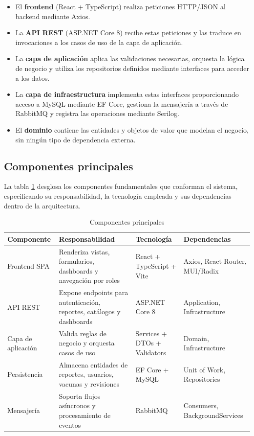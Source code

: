\documentclass[12pt,letterpaper]{article}
\begin{document}
\begin{itemize}
\item El \textbf{frontend} (React + TypeScript) realiza peticiones HTTP/JSON al backend mediante Axios.
\item La \textbf{API REST} (ASP.NET Core 8) recibe estas peticiones y las traduce en invocaciones a los casos de uso de la capa de aplicación.
\item La \textbf{capa de aplicación} aplica las validaciones necesarias, orquesta la lógica de negocio y utiliza los repositorios definidos mediante interfaces para acceder a los datos.
\item La \textbf{capa de infraestructura} implementa estas interfaces proporcionando acceso a MySQL mediante EF Core, gestiona la mensajería a través de RabbitMQ y registra las operaciones mediante Serilog.
\item El \textbf{dominio} contiene las entidades y objetos de valor que modelan el negocio, sin ningún tipo de dependencia externa.
\end{itemize}

\subsection{Componentes principales}

La tabla \ref{tab:componentes} desglosa los componentes fundamentales que conforman el sistema, especificando su responsabilidad, la tecnología empleada y sus dependencias dentro de la arquitectura.

\begin{table}[H]
\centering
\caption{Componentes principales}
\label{tab:componentes}
\begin{tabular}{|l|p{7cm}|p{3cm}|p{3cm}|}
\hline
\textbf{Componente} & \textbf{Responsabilidad} & \textbf{Tecnología} & \textbf{Dependencias} \\ \hline
Frontend SPA & Renderiza vistas, formularios, dashboards y navegación por roles & React + TypeScript + Vite & Axios, React Router, MUI/Radix  \\ \hline
API REST & Expone endpoints para autenticación, reportes, catálogos y dashboards & ASP.NET Core 8 & Application, Infrastructure \\ \hline
Capa de aplicación & Valida reglas de negocio y orquesta casos de uso & Services + DTOs + Validators & Domain, Infrastructure \\ \hline
Persistencia & Almacena entidades de reportes, usuarios, vacunas y revisiones & EF Core + MySQL & Unit of Work, Repositories \\ \hline
Mensajería & Soporta flujos asíncronos y procesamiento de eventos & RabbitMQ & Consumers, BackgroundServices \\ \hline
\end{tabular}
\end{table}
\end{document}
